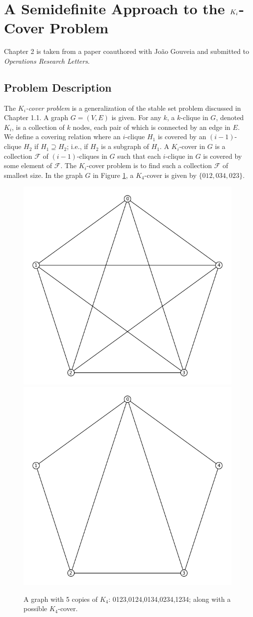 \section{A Semidefinite Approach to the $K_{\lowercase{i}}$-Cover Problem}
Chapter 2 is taken from a paper coauthored with Jo\~ao Gouveia and submitted to \emph{Operations Research Letters}. 

\subsection{Problem Description}

The {\em $K_i$-cover problem} is a generalization of the stable set problem discussed in Chapter 1.1. 
A graph $G = (V,E)$ is given. 
For any $k$, a $k$-clique in $G$, denoted $K_i$, is a collection of $k$ nodes, each pair of which is connected by an edge in $E$.
We define a covering relation where an $i$-clique $H_1$ is covered by an $(i-1)$-clique $H_2$ if $H_1 \supseteq H_2$; i.e., if $H_2$ is a subgraph of $H_1$. 
A $K_i$-cover in $G$ is a collection $\mathcal{F}$ of $(i-1)$-cliques in $G$ such that each $i$-clique in $G$ is covered by some element of $\mathcal{F}$. 
The $K_i$-cover problem is to find such a collection $\mathcal{F}$ of smallest size.
In the graph $G$ in Figure \ref{K5}, a $K_4$-cover is given by $\{012,034,023\}$.

\begin{figure}[htd]
	\centering
	\includegraphics[width=.4\textwidth,natwidth=613,natheight=584]{K5.png}
	\includegraphics[width=.4\textwidth,natwidth=613,natheight=584]{K4cover.png}
	\caption{A graph with 5 copies of $K_4$: 0123,0124,0134,0234,1234; along with a possible $K_4$-cover.}
	\label{K5}
\end{figure}

